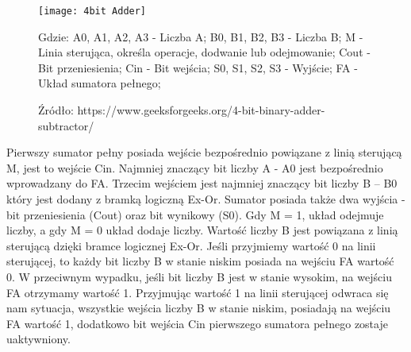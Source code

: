 \documentclass[12pt, a4paper, onside, polish]{article}				%
\begin{document}
 \begin{figure}[H]
{\centering \texttt{[image: 4bit Adder]} \caption{Sumator/Subtraktor - 4 bit} \caption*{Źródło: https://www.geeksforgeeks.org/4-bit-binary-adder-subtractor/}}\vspace{5mm}
Gdzie:\newline
A0, A1, A2, A3 - Liczba A;\newline
B0, B1, B2, B3 - Liczba B;\newline
M - Linia sterująca, określa operacje, dodwanie lub odejmowanie;\newline
Cout - Bit przeniesienia;\newline
Cin - Bit wejścia;\newline
S0, S1, S2, S3 - Wyjście; \newline
FA - Układ sumatora pełnego; \newline\newline
\end{figure}

Pierwszy sumator pełny posiada wejście bezpośrednio powiązane z linią sterującą M, jest to wejście Cin. Najmniej znaczący bit liczby A - A0 jest bezpośrednio wprowadzany do FA. Trzecim wejściem jest najmniej znaczący bit liczby B – B0 który jest dodany z bramką logiczną Ex-Or. Sumator posiada także dwa wyjścia - bit przeniesienia (Cout) oraz bit wynikowy (S0). Gdy M = 1, układ odejmuje liczby, a gdy M = 0 układ dodaje liczby. Wartość liczby B jest powiązana z linią sterującą dzięki bramce logicznej Ex-Or. Jeśli przyjmiemy wartość 0 na linii sterującej, to każdy bit liczby B w stanie niskim posiada na wejściu FA wartość 0.  W przeciwnym wypadku, jeśli bit liczby B jest w stanie wysokim, na wejściu FA otrzymamy wartość 1. Przyjmując wartość 1 na linii sterującej odwraca się nam sytuacja, wszystkie wejścia liczby B w stanie niskim, posiadają na wejściu FA wartość 1, dodatkowo bit wejścia Cin pierwszego sumatora pełnego zostaje uaktywniony.  
\end{document}
